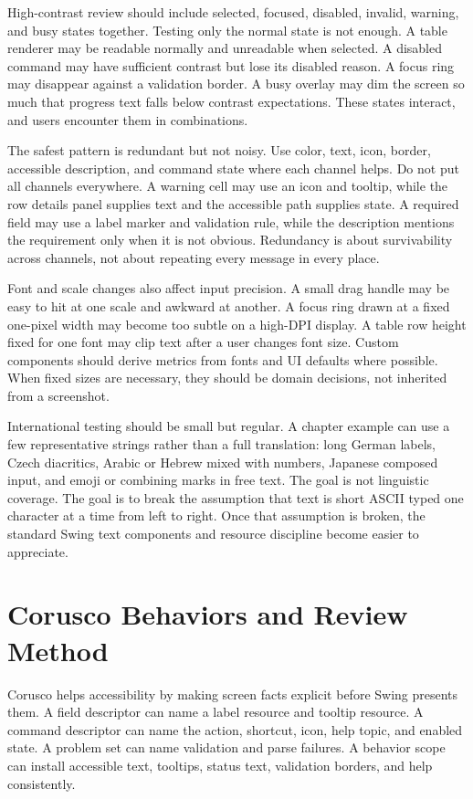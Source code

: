 High-contrast review should include selected, focused, disabled, invalid,
warning, and busy states together. Testing only the normal state is not enough.
A table renderer may be readable normally and unreadable when selected. A
disabled command may have sufficient contrast but lose its disabled reason. A
focus ring may disappear against a validation border. A busy overlay may dim
the screen so much that progress text falls below contrast expectations. These
states interact, and users encounter them in combinations.

The safest pattern is redundant but not noisy. Use color, text, icon, border,
accessible description, and command state where each channel helps. Do not put
all channels everywhere. A warning cell may use an icon and tooltip, while the
row details panel supplies text and the accessible path supplies state. A
required field may use a label marker and validation rule, while the description
mentions the requirement only when it is not obvious. Redundancy is about
survivability across channels, not about repeating every message in every
place.

Font and scale changes also affect input precision. A small drag handle may be
easy to hit at one scale and awkward at another. A focus ring drawn at a fixed
one-pixel width may become too subtle on a high-DPI display. A table row height
fixed for one font may clip text after a user changes font size. Custom
components should derive metrics from fonts and UI defaults where possible.
When fixed sizes are necessary, they should be domain decisions, not inherited
from a screenshot.

International testing should be small but regular. A chapter example can use a
few representative strings rather than a full translation: long German labels,
Czech diacritics, Arabic or Hebrew mixed with numbers, Japanese composed input,
and emoji or combining marks in free text. The goal is not linguistic coverage.
The goal is to break the assumption that text is short ASCII typed one
character at a time from left to right. Once that assumption is broken, the
standard Swing text components and resource discipline become easier to
appreciate.

\section{Corusco Behaviors and Review Method}

Corusco helps accessibility by making screen facts explicit before Swing presents them. A field descriptor can name a label resource and tooltip resource. A command descriptor can name the action, shortcut, icon, help topic, and enabled state. A problem set can name validation and parse failures. A behavior scope can install accessible text, tooltips, status text, validation borders, and help consistently.

